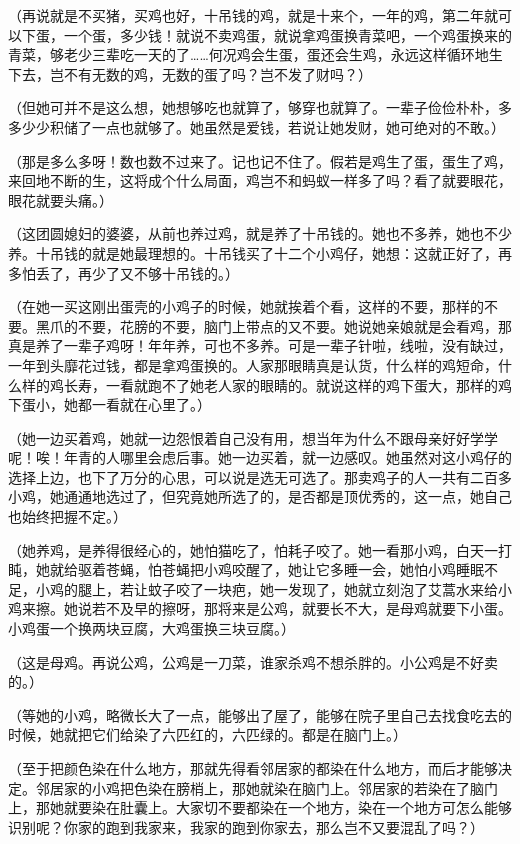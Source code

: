 \documentclass[UTF8]{ctexart}
\begin{document}
（再说就是不买猪，买鸡也好，十吊钱的鸡，就是十来个，一年的鸡，第二年就可以下蛋，一个蛋，多少钱！就说不卖鸡蛋，就说拿鸡蛋换青菜吧，一个鸡蛋换来的青菜，够老少三辈吃一天的了……何况鸡会生蛋，蛋还会生鸡，永远这样循环地生下去，岂不有无数的鸡，无数的蛋了吗？岂不发了财吗？）

（但她可并不是这么想，她想够吃也就算了，够穿也就算了。一辈子俭俭朴朴，多多少少积储了一点也就够了。她虽然是爱钱，若说让她发财，她可绝对的不敢。）

（那是多么多呀！数也数不过来了。记也记不住了。假若是鸡生了蛋，蛋生了鸡，来回地不断的生，这将成个什么局面，鸡岂不和蚂蚁一样多了吗？看了就要眼花，眼花就要头痛。）

（这团圆媳妇的婆婆，从前也养过鸡，就是养了十吊钱的。她也不多养，她也不少养。十吊钱的就是她最理想的。十吊钱买了十二个小鸡仔，她想：这就正好了，再多怕丢了，再少了又不够十吊钱的。）

（在她一买这刚出蛋壳的小鸡子的时候，她就挨着个看，这样的不要，那样的不要。黑爪的不要，花膀的不要，脑门上带点的又不要。她说她亲娘就是会看鸡，那真是养了一辈子鸡呀！年年养，可也不多养。可是一辈子针啦，线啦，没有缺过，一年到头靡花过钱，都是拿鸡蛋换的。人家那眼睛真是认货，什么样的鸡短命，什么样的鸡长寿，一看就跑不了她老人家的眼睛的。就说这样的鸡下蛋大，那样的鸡下蛋小，她都一看就在心里了。）

（她一边买着鸡，她就一边怨恨着自己没有用，想当年为什么不跟母亲好好学学呢！唉！年青的人哪里会虑后事。她一边买着，就一边感叹。她虽然对这小鸡仔的选择上边，也下了万分的心思，可以说是选无可选了。那卖鸡子的人一共有二百多小鸡，她通通地选过了，但究竟她所选了的，是否都是顶优秀的，这一点，她自己也始终把握不定。）

（她养鸡，是养得很经心的，她怕猫吃了，怕耗子咬了。她一看那小鸡，白天一打盹，她就给驱着苍蝇，怕苍蝇把小鸡咬醒了，她让它多睡一会，她怕小鸡睡眠不足，小鸡的腿上，若让蚊子咬了一块疤，她一发现了，她就立刻泡了艾蒿水来给小鸡来擦。她说若不及早的擦呀，那将来是公鸡，就要长不大，是母鸡就要下小蛋。小鸡蛋一个换两块豆腐，大鸡蛋换三块豆腐。）

（这是母鸡。再说公鸡，公鸡是一刀菜，谁家杀鸡不想杀胖的。小公鸡是不好卖的。）

（等她的小鸡，略微长大了一点，能够出了屋了，能够在院子里自己去找食吃去的时候，她就把它们给染了六匹红的，六匹绿的。都是在脑门上。）

（至于把颜色染在什么地方，那就先得看邻居家的都染在什么地方，而后才能够决定。邻居家的小鸡把色染在膀梢上，那她就染在脑门上。邻居家的若染在了脑门上，那她就要染在肚囊上。大家切不要都染在一个地方，染在一个地方可怎么能够识别呢？你家的跑到我家来，我家的跑到你家去，那么岂不又要混乱了吗？）
\end{document}
